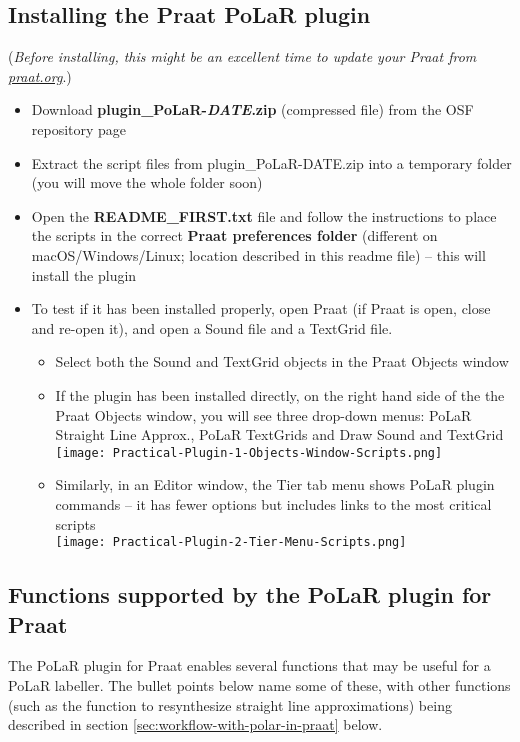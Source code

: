 \subsection{Installing the Praat PoLaR plugin}
(\textit{Before installing, this might be an excellent time to update your Praat from \href{https://www.praat.org}{praat.org}}.)
\begin{itemize}
	\item Download \textbf{plugin\_PoLaR-\textit{DATE}.zip} (compressed file) from the OSF repository page
	\item Extract the script files from plugin\_PoLaR-DATE.zip into a temporary folder (you will move the whole folder soon)
	\item Open the \textbf{README\_FIRST.txt} file and follow the instructions to place the scripts in the correct \textbf{Praat preferences folder} (different on macOS\slash Windows\slash Linux; location described in this readme file) – this will install the plugin
	\item To test if it has been installed properly, open Praat (if Praat is open, close and re-open it), and open a Sound file and a TextGrid file.
	\begin{itemize}
		\item Select both the Sound and TextGrid objects in the Praat Objects window
		\item If the plugin has been installed directly, on the right hand side of the the Praat Objects window, you will see three drop-down menus: PoLaR Straight Line Approx., PoLaR TextGrids and Draw Sound and TextGrid\\
			\texttt{[image: Practical-Plugin-1-Objects-Window-Scripts.png]}
		\item Similarly, in an Editor window, the Tier tab menu shows PoLaR plugin commands – it has fewer options but includes links to the most critical scripts\\
			\texttt{[image: Practical-Plugin-2-Tier-Menu-Scripts.png]}
	\end{itemize}
\end{itemize}

\subsection{Functions supported by the PoLaR plugin for Praat}
The PoLaR plugin for Praat enables several functions that may be useful for a PoLaR labeller. The bullet points below name some of these, with other functions (such as the function to resynthesize straight line approximations) being described in section \ref{sec:workflow-with-polar-in-praat} below.

